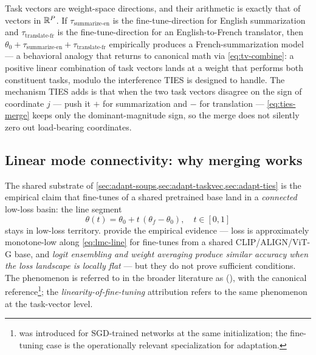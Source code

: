 \begin{intuition}
Task vectors are weight-space directions, and their arithmetic is
exactly that of vectors in $\mathbb{R}^P$. If $\tau_{\text{summarize-en}}$ is
the fine-tune-direction for English summarization and
$\tau_{\text{translate-fr}}$ is the fine-tune-direction for an
English-to-French translator, then
$\theta_0 + \tau_{\text{summarize-en}} + \tau_{\text{translate-fr}}$
empirically produces a French-summarization model
\citep[\S 3]{ilharco2022-task-vectors} — a behavioral analogy that
returns to canonical math via \cref{eq:tv-combine}: a positive linear
combination of task vectors lands at a weight that performs both
constituent tasks, modulo the interference TIES is designed to handle.
The mechanism TIES adds is that when the two task vectors disagree on
the sign of coordinate $j$ — push it $+$ for summarization and $-$ for
translation — \cref{eq:ties-merge} keeps only the dominant-magnitude
sign, so the merge does not silently zero out load-bearing
coordinates.
\end{intuition}

\subsection{Linear mode connectivity: why merging works}
\label{sec:adapt-lmc}

The shared substrate of \cref{sec:adapt-soups,sec:adapt-taskvec,sec:adapt-ties}
is the empirical claim that fine-tunes of a shared pretrained base land
in a \emph{connected} low-loss basin: the line segment
\begin{equation}
\theta(t) = \theta_0 + t\, (\theta_f - \theta_0),
\quad t \in [0, 1]
\label{eq:lmc-line}
\end{equation}
stays in low-loss territory. \citet[\S 3]{wortsman2022-model-soups}
provide the empirical evidence — loss is approximately monotone-low
along \cref{eq:lmc-line} for fine-tunes from a shared CLIP/ALIGN/ViT-G
base, and \emph{logit ensembling and weight averaging produce similar
accuracy when the loss landscape is locally flat}
\citep[\S 4]{wortsman2022-model-soups} — but they do not prove sufficient
conditions. The phenomenon is referred to in the broader literature as
\emph{} (), with \citet{frankle2020-lmc} the canonical reference\footnote{ was introduced for SGD-trained
networks at the same initialization; the fine-tuning case is the
operationally relevant specialization for adaptation.}; the
\citet[\S 4]{ilharco2022-task-vectors} \emph{linearity-of-fine-tuning}
attribution refers to the same phenomenon at the task-vector level.

